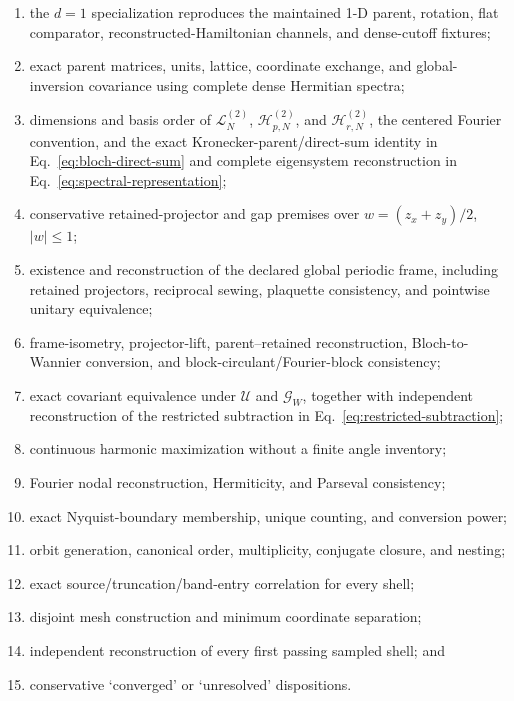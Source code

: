 \documentclass[11pt]{article}
\begin{document}
\begin{enumerate}[label=\arabic*.]
 \item the $d=1$ specialization reproduces the maintained 1-D parent, rotation, flat
       comparator, reconstructed-Hamiltonian channels, and dense-cutoff fixtures;
 \item exact parent matrices, units, lattice, coordinate exchange, and global-inversion
       covariance using complete dense Hermitian spectra;
 \item dimensions and basis order of $\mathcal L_N^{(2)}$, $\mathcal H_{p,N}^{(2)}$,
       and $\mathcal H_{r,N}^{(2)}$, the centered Fourier convention, and the exact
       Kronecker-parent/direct-sum identity in Eq.~\eqref{eq:bloch-direct-sum} and
       complete eigensystem reconstruction in Eq.~\eqref{eq:spectral-representation};
 \item conservative retained-projector and gap premises over
       $w=(z_x+z_y)/2$, $|w|\le1$;
 \item existence and reconstruction of the declared global periodic frame, including
       retained projectors, reciprocal sewing, plaquette consistency, and pointwise
       unitary equivalence;
 \item frame-isometry, projector-lift, parent--retained reconstruction, Bloch-to-Wannier
       conversion, and block-circulant/Fourier-block consistency;
 \item exact covariant equivalence under $\mathcal U$ and $\mathcal G_W$, together with
       independent reconstruction of the restricted subtraction in
       Eq.~\eqref{eq:restricted-subtraction};
 \item continuous harmonic maximization without a finite angle inventory;
 \item Fourier nodal reconstruction, Hermiticity, and Parseval consistency;
 \item exact Nyquist-boundary membership, unique counting, and conversion power;
 \item orbit generation, canonical order, multiplicity, conjugate closure, and nesting;
 \item exact source/truncation/band-entry correlation for every shell;
 \item disjoint mesh construction and minimum coordinate separation;
 \item independent reconstruction of every first passing sampled shell; and
 \item conservative `converged' or `unresolved' dispositions.
\end{enumerate}
\end{document}
